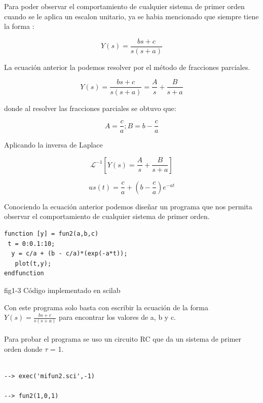 \documentclass[12pt,a4paper]{IEEEtran}
\begin{document}
Para poder observar el comportamiento de cualquier sistema de primer orden cuando se le aplica un escalon unitario, ya se habia mencionado que siempre tiene la forma : 

$$Y(s) = \frac{bs + c}{s(s + a)}$$

La ecuación anterior la podemos resolver por el método de fracciones parciales.

$$Y(s) = \frac{bs + c}{s(s + a)} = \frac{A}{s} + \frac{B}{s + a}$$

donde al resolver las fracciones parciales se obtuvo que:

$$A = \frac{c}{a} ; B = b - \frac{c}{a}$$

Aplicando la inversa de Laplace

$$\mathcal{L}^{-1}[Y(s) = \frac{A}{s} + \frac{B}{s + a}]$$

$$us(t) = \frac{c}{a} + (b - \frac{c}{a})e^{-at}  $$

Conociendo la ecuación anterior podemos diseñar un programa que nos permita observar el comportamiento de cualquier sistema de primer orden. 
\begin{center}
\begin{verbatim}
function [y] = fun2(a,b,c)
 t = 0:0.1:10;
  y = c/a + (b - c/a)*(exp(-a*t));
   plot(t,y);
endfunction
\end{verbatim}
fig1-3 Código implementado en scilab \cite{Mora}
\end{center} 

Con este programa solo basta con escribir la ecuación de la forma $Y(s) = \frac{bs + c}{s(s + a)}$ para encontrar los valores de a, b y c. \\ \\
Para probar el programa se uso un circuito RC que da un sistema de primer orden donde $\tau$ = 1. 

\begin{verbatim}

--> exec('mifun2.sci',-1)

--> fun2(1,0,1)

\end{verbatim}
\end{document}
